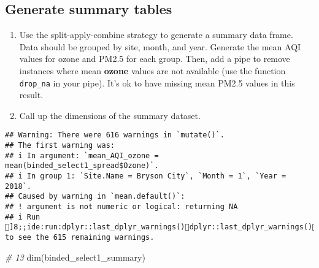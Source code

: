 \documentclass[
]{article}
\newenvironment{Shaded}{\begin{snugshade}}{\end{snugshade}}
\newcommand{\AttributeTok}[1]{\textcolor[rgb]{0.77,0.63,0.00}{#1}}
\newcommand{\CommentTok}[1]{\textcolor[rgb]{0.56,0.35,0.01}{\textit{#1}}}
\newcommand{\FloatTok}[1]{\textcolor[rgb]{0.00,0.00,0.81}{#1}}
\newcommand{\FunctionTok}[1]{\textcolor[rgb]{0.00,0.00,0.00}{#1}}
\newcommand{\NormalTok}[1]{#1}
\newcommand{\OtherTok}[1]{\textcolor[rgb]{0.56,0.35,0.01}{#1}}
\newcommand{\SpecialCharTok}[1]{\textcolor[rgb]{0.00,0.00,0.00}{#1}}
\begin{document}
\hypertarget{generate-summary-tables}{%
\subsection{Generate summary tables}\label{generate-summary-tables}}

\begin{enumerate}
\def\labelenumi{\arabic{enumi}.}
\setcounter{enumi}{11}
\item
  Use the split-apply-combine strategy to generate a summary data frame.
  Data should be grouped by site, month, and year. Generate the mean AQI
  values for ozone and PM2.5 for each group. Then, add a pipe to remove
  instances where mean \textbf{ozone} values are not available (use the
  function \texttt{drop\_na} in your pipe). It's ok to have missing mean
  PM2.5 values in this result.
\item
  Call up the dimensions of the summary dataset.
\end{enumerate}

\begin{Shaded}
\end{Shaded}

\begin{verbatim}
## Warning: There were 616 warnings in `mutate()`.
## The first warning was:
## i In argument: `mean_AQI_ozone = mean(binded_select1_spread$Ozone)`.
## i In group 1: `Site.Name = Bryson City`, `Month = 1`, `Year = 2018`.
## Caused by warning in `mean.default()`:
## ! argument is not numeric or logical: returning NA
## i Run ]8;;ide:run:dplyr::last_dplyr_warnings()dplyr::last_dplyr_warnings()]8;; to see the 615 remaining warnings.
\end{verbatim}

\begin{Shaded}
\begin{Highlighting}[]
\CommentTok{\# 13}
\FunctionTok{dim}\NormalTok{(binded\_select1\_summary)}
\end{Highlighting}
\end{Shaded}
\end{document}
